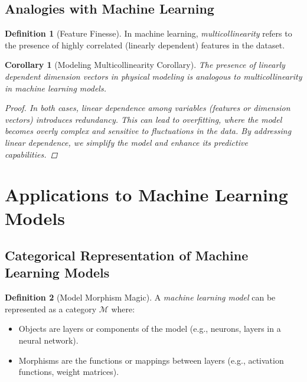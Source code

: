 \documentclass{article}
\newtheorem{corollary}{Corollary}[theorem]
\theoremstyle{definition}
\newtheorem{definition}{Definition}[section]
\theoremstyle{remark}
\begin{document}
	\subsection{Analogies with Machine Learning}
	
	\begin{definition}[Feature Finesse]
		In machine learning, \emph{multicollinearity} refers to the presence of highly correlated (linearly dependent) features in the dataset.
		
	\end{definition}
	
	\begin{corollary}[Modeling Multicollinearity Corollary]
		The presence of linearly dependent dimension vectors in physical modeling is analogous to multicollinearity in machine learning models.
		
		\begin{proof}
			In both cases, linear dependence among variables (features or dimension vectors) introduces redundancy. This can lead to overfitting, where the model becomes overly complex and sensitive to fluctuations in the data. By addressing linear dependence, we simplify the model and enhance its predictive capabilities.
		\end{proof}
	\end{corollary}
	
	\section{Applications to Machine Learning Models}
	
	\subsection{Categorical Representation of Machine Learning Models}
	
	\begin{definition}[Model Morphism Magic]
		A \emph{machine learning model} can be represented as a category $\mathcal{M}$ where:
		\begin{itemize}
			\item Objects are layers or components of the model (e.g., neurons, layers in a neural network).
			\item Morphisms are the functions or mappings between layers (e.g., activation functions, weight matrices).
		\end{itemize}
	\end{definition}
	
\end{document}
